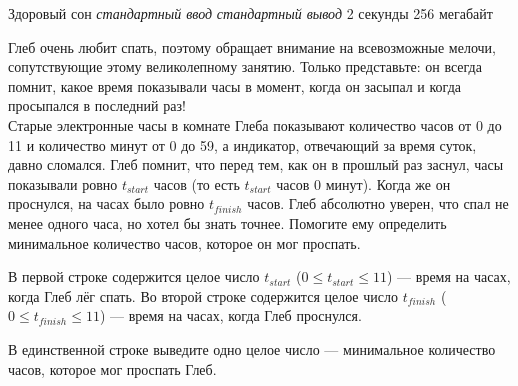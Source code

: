 \begin{problem}%
{Здоровый сон}%
{\textsl{стандартный ввод}}%
{\textsl{стандартный вывод}}%
{2 секунды}%
{256 мегабайт}{}

Глеб очень любит спать, поэтому обращает внимание на всевозможные мелочи, сопутствующие этому великолепному занятию. Только представьте: он всегда помнит, какое время показывали часы в момент, когда он засыпал и когда просыпался в последний раз!\\

Старые электронные часы в комнате Глеба показывают количество часов от 0 до 11 и количество минут от 0 до 59, а индикатор, отвечающий за время суток, давно сломался. Глеб помнит, что перед тем, как он в прошлый раз заснул, часы показывали ровно $t_{start}$ часов (то есть $t_{start}$ часов 0 минут). Когда же он проснулся, на часах было ровно $t_{finish}$ часов. Глеб абсолютно уверен, что спал не менее одного часа, но хотел бы знать точнее. Помогите ему определить минимальное количество часов, которое он мог проспать.

\InputFile

В первой строке содержится целое число $t_{start}$ ($0 \le t_{start} \le 11$) — время на часах, когда Глеб лёг спать. Во второй строке содержится целое число $t_{finish}$ ($0 \le t_{finish} \le 11$) — время на часах, когда Глеб проснулся.

\OutputFile

В единственной строке выведите одно целое число — минимальное количество часов, которое мог проспать Глеб.

\Examples

\begin{example}
%
%
\end{example}
\end{problem}